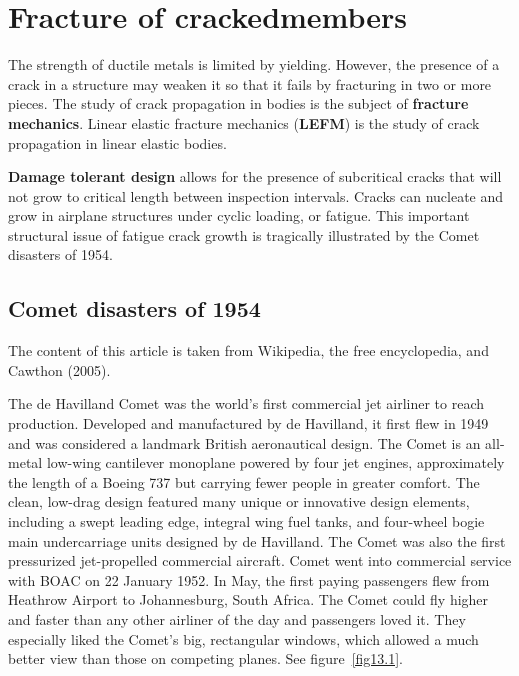 \documentclass{AeroStructure-ERJohnson}
\begin{document}
\mainmatter

\setcounter{page}{345}
\setcounter{chapter}{12}

\chapter{Fracture of cracked\break members} \label{ch13}

The strength of ductile metals is limited by yielding. However, the presence of a crack in a structure may weaken it so that it fails by fracturing in two or more pieces. The study of crack propagation in bodies is the subject of \textbf{fracture mechanics}. Linear elastic fracture mechanics (\textbf{LEFM}) is the study of crack propagation in linear elastic bodies.

\textbf{Damage tolerant design} allows for the presence of subcritical cracks that will not grow to critical length between inspection intervals. Cracks can nucleate and grow in airplane structures under cyclic loading, or fatigue. This important structural issue of fatigue crack growth is tragically illustrated by the Comet disasters of 1954.

\section{Comet disasters of 1954}\label{sec13.1}

The content of this article is taken from Wikipedia, the free encyclopedia, and Cawthon (2005).

The\enlargethispage{-0.2\baselineskip} de Havilland Comet was the world's first commercial jet airliner to reach production. Developed and manufactured by de Havilland, it first flew in 1949 and was considered a landmark British aeronautical design. The Comet is an all-metal low-wing cantilever monoplane powered by four jet engines, approximately the length of a Boeing 737 but carrying fewer people in greater comfort. The clean, low-drag design featured many unique or innovative design elements, including a swept leading edge, integral wing fuel tanks, and four-wheel bogie main undercarriage units designed by de Havilland. The Comet was also the first pressurized jet-propelled commercial aircraft. Comet went into commercial service with BOAC on 22 January 1952. In May, the first paying passengers flew from Heathrow Airport to Johannesburg, South Africa. The Comet could fly higher and faster than any other airliner of the day and passengers loved it. They especially liked the Comet's big, rectangular windows, which allowed a much better view than those on competing planes. See figure~\ref{fig13.1}.
\end{document}
